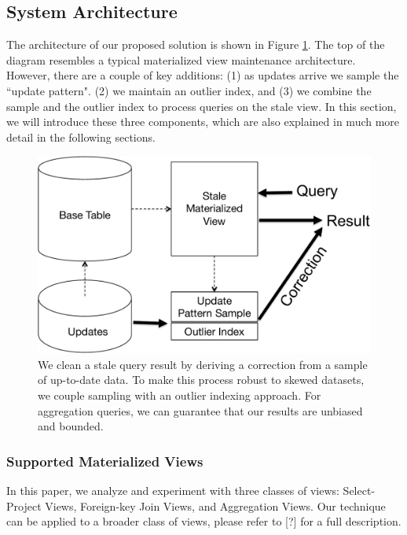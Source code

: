 \subsection{System Architecture}
The architecture of our proposed solution is shown in Figure \ref{sys-arch}.
The top of the diagram resembles a typical materialized view maintenance architecture.
However, there are a couple of key additions: (1) as updates arrive we sample the ``update pattern". 
(2) we maintain an outlier index, and (3) we combine the sample and the outlier index to process queries on the stale view.
In this section, we will introduce these three components, which are also explained in much more detail in the following sections.

\begin{figure}[h]
\label{sys-arch}
\centering
 \includegraphics[scale=0.35]{figs/sys-arch.pdf}
 \caption{We clean a stale query result by deriving a correction from a sample of up-to-date data. To make this process robust to skewed datasets, we couple sampling with an outlier indexing approach. For aggregation queries, we can guarantee that our results are unbiased and bounded.}
\end{figure}

\subsubsection{Supported Materialized Views}\label{subsubsec:supported-view}
In this paper, we analyze and experiment with three classes of views: Select-Project Views, Foreign-key Join Views, and Aggregation Views.
Our technique can be applied to a broader class of views, please refer to [?] for a full description.
\vspace{1em}

